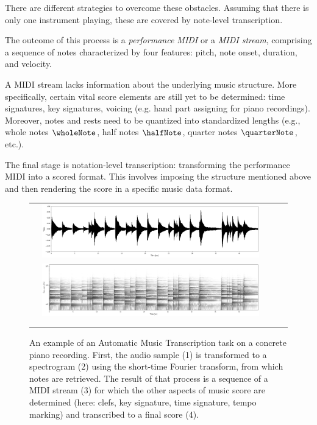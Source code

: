 There are different strategies to overcome these obstacles. Assuming that there is only one instrument playing, these are covered by note-level transcription.

The outcome of this process is a \emph{performance MIDI} or a \emph{MIDI stream}, comprising a sequence of notes characterized by four features: pitch, note onset, duration, and velocity.

A MIDI stream lacks information about the underlying music structure. More specifically, certain vital score elements are still yet to be determined: time signatures, key signatures, voicing (e.g. hand part assigning for piano recordings). Moreover, notes and rests need to be quantized into standardized lengths (e.g., whole notes $\wholeNote$, half notes $\halfNote$, quarter notes $\quarterNote$, etc.).

The final stage is notation-level transcription: transforming the performance MIDI into a scored format. This involves imposing the structure mentioned above and then rendering the score in a specific music data format.

\begin{figure}[ht!]
\centering
\begin{tabular}{>{\centering\arraybackslash} m{} >{\centering\arraybackslash} m{}}
1 &\includegraphics[width=0.9\textwidth]{images/amt_0.png} \\
2 &\includegraphics[width=0.9\textwidth]{images/amt_1.png} \\
3 & \\
4 &
\end{tabular}
\caption[An example of an Automatic Music Transcription task on a concrete piano recording.]{An example of an Automatic Music Transcription task on a concrete piano recording. First, the audio sample (1) is transformed to a spectrogram (2) using the short-time Fourier transform, from which notes are retrieved. The result of that process is a sequence of a MIDI stream (3) for which the other aspects of music score are determined (here: clefs, key signature, time signature, tempo marking) and transcribed to a final score (4).}
\end{figure}

